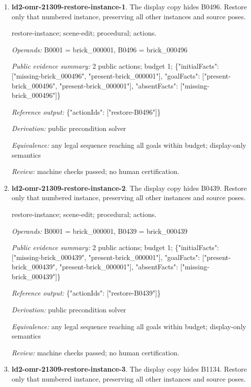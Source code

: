 \begin{enumerate}
\item \textbf{ld2-omr-21309-restore-instance-1}. The display copy hides B0496. Restore only that numbered instance, preserving all other instances and source poses.
\par{\small restore-instance; scene-edit; procedural; actions.\par\textit{Operands:} B0001 = brick\_000001, B0496 = brick\_000496\par\textit{Public evidence summary:} 2 public actions; budget 1; \{"initialFacts": ["missing-brick\_000496", "present-brick\_000001"], "goalFacts": ["present-brick\_000496", "present-brick\_000001"], "absentFacts": ["missing-brick\_000496"]\}\par\textit{Reference output:} \{"actionIds": ["restore-B0496"]\}\par\textit{Derivation:} public precondition solver\par\textit{Equivalence:} any legal sequence reaching all goals within budget; display-only semantics\par\textit{Review:} machine checks passed; no human certification.}
\item \textbf{ld2-omr-21309-restore-instance-2}. The display copy hides B0439. Restore only that numbered instance, preserving all other instances and source poses.
\par{\small restore-instance; scene-edit; procedural; actions.\par\textit{Operands:} B0001 = brick\_000001, B0439 = brick\_000439\par\textit{Public evidence summary:} 2 public actions; budget 1; \{"initialFacts": ["missing-brick\_000439", "present-brick\_000001"], "goalFacts": ["present-brick\_000439", "present-brick\_000001"], "absentFacts": ["missing-brick\_000439"]\}\par\textit{Reference output:} \{"actionIds": ["restore-B0439"]\}\par\textit{Derivation:} public precondition solver\par\textit{Equivalence:} any legal sequence reaching all goals within budget; display-only semantics\par\textit{Review:} machine checks passed; no human certification.}
\item \textbf{ld2-omr-21309-restore-instance-3}. The display copy hides B1134. Restore only that numbered instance, preserving all other instances and source poses.

\end{enumerate}
